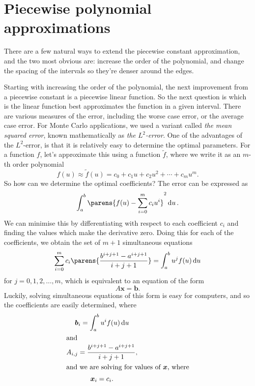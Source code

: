 \documentclass[11pt,a4paper,twoside,english]{extarticle}
\begin{document}
\clearpage
\section{Piecewise polynomial approximations}


There are a few natural ways to extend the piecewise constant approximation, and the two most obvious are: increase the order of the polynomial, and change the spacing of the intervals so they're denser around the edges. 

Starting with increasing the order of the polynomial, the next improvement from a piecewise constant is a piecewise linear function. So the next question is which is the linear function best approximates the function in a given interval. There are various measures of the error, including the worse case error, or the average case error. For Monte Carlo applications, we used a variant called \emph{the mean squared error}, known mathematically as \emph{the $ L^2 $-error}. One of the advantages of the $ L^2 $-error, is that it is relatively easy to determine the optimal parameters. For a function $ f $, let's approximate this using a function $ \tilde{f} $, where we write it as an $ m $-th order polynomial  
\begin{equation}
f(u) \approx \tilde{f}(u) = c_0 + c_1 u + c_2 u^2 + \cdots + c_m u^m. 
\end{equation}
So how can we determine the optimal coefficients? The error can be expressed as 
\begin{equation}
\int_{a}^{b} \parens{f(u) - \sum_{i=0}^{m}c_i u^i}^2 \dd{u}.
\end{equation}
We can minimise this by differentiating with respect to each coefficient $ c_i $ and finding the values which make the derivative zero. Doing this for each of the coefficients, we obtain the set of $ m + 1 $ simultaneous equations 
\begin{equation}
\sum_{i=0}^{m} c_i \parens{\dfrac{b^{i+j+1} - a^{i + j + 1}}{i + j + 1}} = \int_{a}^{b} u^j f(u) \dd{u}
\end{equation}
for $ j = 0,1,2,\ldots,m $, which is equivalent to an equation of the form 
\begin{equation}
A\bm{x} = \bm{b}.
\end{equation} 
Luckily, solving simultaneous equations of this form is easy for computers, and so the coefficients are easily determined, where 
\begin{gather}
\bm{b}_i = \int_{a}^{b} u^i f(u) \dd{u} \\
\shortintertext{and}
A_{i,j} = \dfrac{b^{i+j+1} - a^{i + j + 1}}{i + j + 1}, \\
\shortintertext{and we are solving for values of $ \bm{x} $, where}
\bm{x}_i = c_i.
\end{gather}
\end{document}
